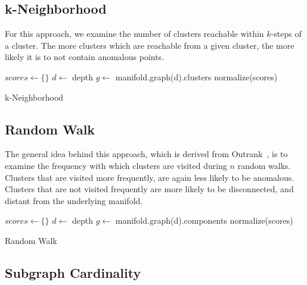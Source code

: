 \subsection{k-Neighborhood}

For this approach, we examine the number of clusters reachable within $k$-steps of a cluster.
The more clusters which are reachable from a given cluster, the more likely it is to not contain anomalous points.

\begin{algorithm}
\DontPrintSemicolon
\SetAlgoLined
{}
 $scores \leftarrow \{\}$\;
 $d \leftarrow $ depth\;
 $g \leftarrow $ manifold.graph(d).clusters\;
 normalize(scores)\;
 \caption{k-Neighborhood}
 \label{alg-kneighborhood}
\end{algorithm}

\subsection{Random Walk}

The general idea behind this approach, which is derived from Outrank~\cite{moonesinghe_outrank:_2008}, is to examine the frequency with which clusters are visited during $n$ random walks.
Clusters that are visited more frequently, are again less likely to be anomalous.
Clusters that are not visited frequently are more likely to be disconnected, and distant from the underlying manifold.

\begin{algorithm}
\DontPrintSemicolon
\SetAlgoLined
{}
 $scores \leftarrow \{\}$\;
 $d \leftarrow $ depth\;
 $g \leftarrow $ manifold.graph(d).components\;
 normalize(scores)\;
 \caption{Random Walk}
 \label{alg-rw}
\end{algorithm}

\subsection{Subgraph Cardinality}

